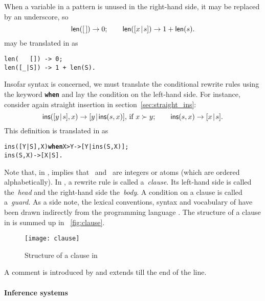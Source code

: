 When a variable in a pattern is unused in the right\hyp{}hand side, it
may be replaced by an underscore, so
\begin{equation*}
\textsf{len}([\,])         \rightarrow 0;\qquad
\textsf{len}([{x}\!\mid\!{s}]) \rightarrow 1 + \textsf{len}(s).
\end{equation*}
may be translated in \Erlang as
\begin{verbatim}
len(   []) -> 0;
len([_|S]) -> 1 + len(S).
\end{verbatim}
Insofar syntax is concerned, we must translate the conditional rewrite
rules using the keyword \texttt{\textbf{when}} and lay the condition
on the left\hyp{}hand side. For instance, consider again straight
insertion in section~\ref{sec:straight_ins}:
\begin{equation*}
\textsf{ins}([{y}\!\mid\!{s}],x) \rightarrow
[{y}\!\mid\!{\textsf{ins}(s,x)}], \,\text{if \(x \succ y\)};\qquad
\textsf{ins}(s,x) \rightarrow [{x}\!\mid\!{s}].
\end{equation*}
This definition is translated in \Erlang as
\begin{alltt}
ins([Y|S],X) \textbf{when} X > Y -> [Y|ins(S,X)];
ins(    S,X)            -> [X|S].
\end{alltt}
Note that, in \Erlang,  implies that
~and~ are integers or atoms (which are ordered
alphabetically). In \Erlang, a rewrite rule is called
a~\emph{clause}. Its left\hyp{}hand side is called the~\emph{head} and
the right\hyp{}hand side the~\emph{body}. A condition on a clause is
called a~\emph{guard}. As a side note, the lexical conventions, syntax
and vocabulary of \Erlang have been drawn indirectly from the \Prolog
programming language \citep{SterlingShapiro_1994,Bratko_2000}. The
structure of a clause in \Erlang is summed up in
\fig~\vref{fig:clause}.
\begin{figure}[t]
\centering
\texttt{[image: clause]}
\caption{Structure of a clause in \Erlang}
\label{fig:clause}
\end{figure}

A comment is introduced by \erlcode{\%} and extends till the end of
the line.

\paragraph{Inference systems}

